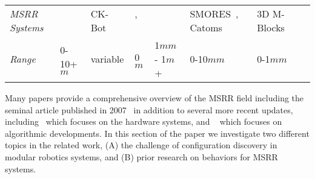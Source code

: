 \begin{table*}[h]
\begin{tabular}{ p{2.4 cm} p{\wdd}  p{\wdd} p{\wdd} p{\wdd} p{\wdd} p{\wdd} p{\wdd}  }
		\addlinespace[1ex] 	\textit{MSRR Systems}
		& \cite{StigmergyWerfel2006}	%
		& CK-Bot~\cite{park2008automatic}					%
		& \cite{Soldercubes2016}, ~\cite{ubot-Zhu-2014}	%
		& \cite{lin2017vision}								%
		& SMORES~\cite{TosunDaveyLiuYim-IROS2016}, Catoms~\cite{Kirby-IROS07}					%
		& 3D M-Blocks~\cite{Romanishin20153d}	\\ 			%
		
		\addlinespace[1ex] 	\textit{Range}										& 0-10+$m$		& variable				& 0 $m$								& 1$mm$ - 1$m$ +		& 0-10$mm$				& 0-1$mm$	\\
	\end{tabular}
	\label{tab:tagTech}
\end{table*}


Many papers provide a comprehensive overview of the MSRR field including the seminal article published in 2007~\cite{Yim-RAM07} in addition to several more recent updates, including~\cite{chennareddy2017modular} which focuses on the hardware systems, and ~\cite{abukhalil2013survey} which focuses on algorithmic developments. In this section of the paper we investigate two different topics in the related work, (A) the challenge of configuration discovery in modular robotics systems, and (B) prior research on behaviors for MSRR systems.

